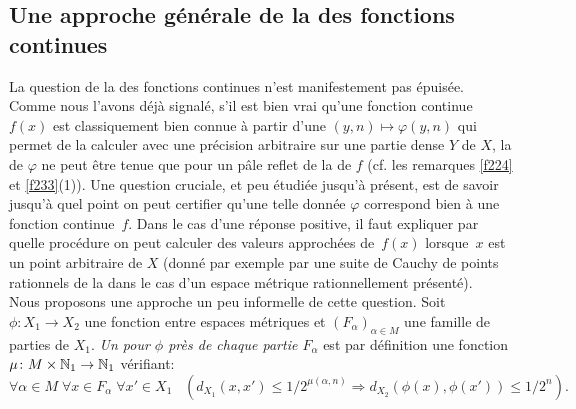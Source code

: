 \subsection{Une approche générale de la \com des fonctions continues  } 
\label{fsubsec24} 
La question de la \com des fonctions continues n'est manifestement pas 
épuisée. 
Comme nous l'avons déjà signalé, s'il est bien vrai qu'une fonction 
continue  $f(x)$  est classiquement bien connue à partir d'une \pres  $(y, 
n) \mapsto \varphi(y,n)$  qui permet de la calculer avec une précision 
arbitraire sur une partie dense  $Y$  de  $X$, la \com de  $\varphi$  ne peut 
être tenue que pour un pâle reflet de la \com de  $f$  (cf. les remarques 
\ref{f224} et \ref{f233}(1)).
Une question cruciale, et peu étudiée jusqu'à présent, est de savoir 
jusqu'à quel point on peut certifier qu'une telle donnée  $\varphi$  
correspond bien à une fonction continue~$f$. Dans le cas d'une réponse 
positive, il faut expliquer par quelle procédure on peut calculer des valeurs approchées de~$f(x)$  lorsque~$x$  est un point arbitraire de  $X$  (donné par exemple par une suite de Cauchy de points rationnels de la \pres dans le cas d'un espace métrique rationnellement présenté).\\
Nous proposons une approche un peu informelle de cette question.
Soit  $\phi \colon  X_1 \rightarrow X_2$  une fonction entre espaces métriques et  
$(F_{\alpha})_{\alpha \in M}$  une famille de parties de $X_1$.  {\em Un \mcu 
pour  $\phi$  près de chaque partie  $F_{\alpha}$ } est par définition une 
fonction   $\mu \colon M \times \mathbb {N}_1 \rightarrow \mathbb {N}_1$  vérifiant:	
\[ 
\forall \alpha \in M \; \forall x \in F_{\alpha} \; \forall x'\in X_1\; \; \; \left(d_{X_1}(x,x') 
\leq 1/2^{\mu(\alpha,n)} \Rightarrow d_{X_2}(\phi(x),\phi(x'))
 \leq 1/2^n \right).
\]

